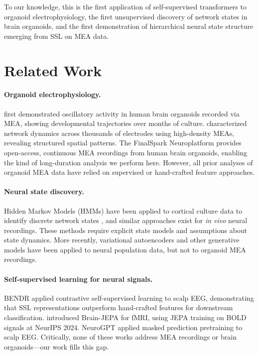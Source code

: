 \documentclass{article}
\begin{document}
To our knowledge, this is the first application of self-supervised transformers to organoid electrophysiology, the first unsupervised discovery of network states in brain organoids, and the first demonstration of hierarchical neural state structure emerging from SSL on MEA data.

\section{Related Work}

\paragraph{Organoid electrophysiology.}
\citet{trujillo2019complex} first demonstrated oscillatory activity in human brain organoids recorded via MEA, showing developmental trajectories over months of culture. \citet{sharf2022functional} characterized network dynamics across thousands of electrodes using high-density MEAs, revealing structured spatial patterns. The FinalSpark Neuroplatform \citep{jordan2024open} provides open-access, continuous MEA recordings from human brain organoids, enabling the kind of long-duration analysis we perform here. However, all prior analyses of organoid MEA data have relied on supervised or hand-crafted feature approaches.

\paragraph{Neural state discovery.}
Hidden Markov Models (HMMs) have been applied to cortical culture data to identify discrete network states \citep{beggs2003neuronal}, and similar approaches exist for \textit{in vivo} neural recordings. These methods require explicit state models and assumptions about state dynamics. More recently, variational autoencoders and other generative models have been applied to neural population data, but not to organoid MEA recordings.

\paragraph{Self-supervised learning for neural signals.}
BENDR \citep{kostas2021bendr} applied contrastive self-supervised learning to scalp EEG, demonstrating that SSL representations outperform hand-crafted features for downstream classification. \citet{dong2024brainjepa} introduced Brain-JEPA for fMRI, using JEPA training on BOLD signals at NeurIPS 2024. NeuroGPT \citep{cui2024neurogpt} applied masked prediction pretraining to scalp EEG. Critically, none of these works address MEA recordings or brain organoids---our work fills this gap.
\end{document}
